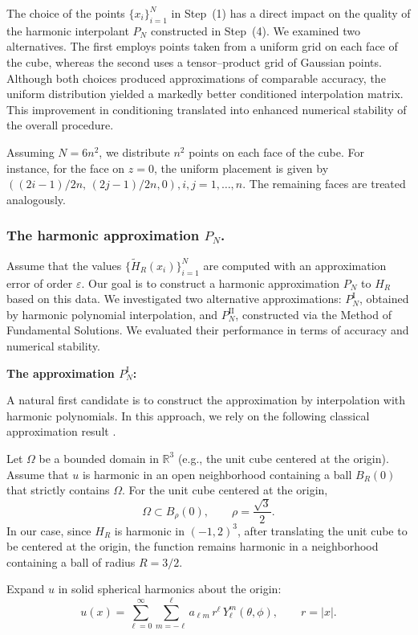\documentclass[12pt,oneside,reqno]{amsart}%
\theoremstyle{plain}
\numberwithin{equation}{section}
\begin{document}
The choice of the points $\{x_i\}_{i=1}^N$ in Step~(1)
has a direct impact on the quality of the harmonic interpolant $P_N$
constructed in Step~(4).
We examined two alternatives.
The first employs points taken from a uniform grid on each face of the cube,
whereas the second uses a tensor--product grid of Gaussian points.
Although both choices produced approximations of comparable accuracy,
the uniform distribution yielded a markedly better conditioned
interpolation matrix.
This improvement in conditioning translated into enhanced numerical stability
of the overall procedure.

Assuming $N=6n^2$, we distribute $n^2$ points on each face of the cube.
For instance, for the face on $z=0$, 
the uniform placement is given by $\left({(2i-1)}/{2n},\,{(2j-1)}/{2n},0\right), i,j=1,\ldots,n.$ 
The remaining faces are treated analogously.

\subsubsection{The harmonic approximation $P_N$.}\label{PN}\hfill

Assume that the values $\{\tilde H_R(x_i)\}_{i=1}^N$
are computed with an approximation error of order $\varepsilon$.
Our goal is to construct a harmonic approximation $P_N$
to $H_R$ based on this data. We investigated two alternative approximations:
$P_N^{\mathrm{I}}$, obtained by harmonic polynomial interpolation,
and $P_N^{\mathrm{II}}$, constructed via the Method of Fundamental Solutions.
We evaluated their performance in terms of accuracy and numerical stability.

\noindent\textbf{The approximation $P_N^{\mathrm{I}}$:}

A natural first candidate is to construct the approximation by interpolation with harmonic polynomials.
In this approach, we rely on the following classical approximation result
\cite{Walsh,dai2013}.

Let $\Omega$ be a bounded domain in $\mathbb{R}^3$
(e.g., the unit cube centered at the origin).
Assume that $u$ is harmonic in an open neighborhood
containing a ball $B_R(0)$ that strictly contains $\Omega$.
For the unit cube centered at the origin,
\[
\Omega \subset B_\rho(0),
\qquad \rho=\frac{\sqrt{3}}{2}.
\]
 In our case, since $H_R$ is harmonic in $(-1,2)^3$,
after translating the unit cube to be centered at the origin,
the function remains harmonic in a neighborhood
containing a ball of radius $R= 3/2$.


Expand $u$ in solid spherical harmonics about the origin:
\[
u(x)
=
\sum_{\ell=0}^{\infty}
\sum_{m=-\ell}^{\ell}
a_{\ell m}\,
r^{\ell}\,
Y_\ell^{m}(\theta,\phi),
\qquad r=|x|.
\]
\end{document}
